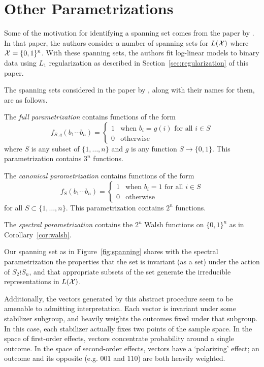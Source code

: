 \documentclass[cclicense]{hmcthesis}
\numberwithin{equation}{chapter}
\numberwithin{ucounter}{chapter}
\begin{document}
\section{Other Parametrizations}

    Some of the motivation for identifying a spanning set comes from the paper
    by \citet{SPEC}.  In that paper, the authors consider a number of spanning
    sets for $L(\mathcal{X})$ where $\mathcal{X} = \{0, 1\}^n$.  With these spanning sets, the
    authors fit log-linear models to binary data using $L_1$ regularization as
    described in Section~\ref{sec:regularization} of this paper.

    The spanning sets considered in the paper by \citet{SPEC}, along with their
    names for them, are as follows.

    The \emph{full parametrization} contains functions of the form
    \[
        f_{S, g}(b_1 \cdots b_n) = \begin{cases}
            1 & \text{when $b_i = g(i)$ for all $i \in S$} \\
            0 & \text{otherwise}
        \end{cases}
    \]
    where $S$ is any subset of $\{1, \ldots, n\}$ and $g$ is any function $S \to
    \{0, 1\}$.  This parametrization contains $3^n$ functions.

    The \emph{canonical parametrization} contains functions of the form
    \[
        f_S(b_1 \cdots b_n) = \begin{cases}
            1 & \text{when $b_i = 1$ for all $i \in S$} \\
            0 & \text{otherwise}
        \end{cases}
    \]
    for all $S \subset \{1, \ldots, n\}$.  This parametrization contains $2^n$
    functions.

    The \emph{spectral parametrization} contains the $2^n$ Walsh functions on
    $\{0, 1\}^n$ as in Corollary~\ref{cor:walsh}.

    Our spanning set as in Figure~\ref{fig:spanning} shares with the spectral
    parametrization the properties that the set is invariant (as a set) under
    the action of $S_2 \wr S_n$, and that appropriate subsets of the set generate
    the irreducible representations in $L(\mathcal{X})$.  
    
    Additionally, the vectors generated by this abstract procedure seem to be
    amenable to admitting interpretation.  Each vector is invariant under some
    stabilizer subgroup, and heavily weights the outcomes fixed under that
    subgroup.  In this case, each stabilizer actually fixes two points of the
    sample space.  In the space of first-order effects, vectors concentrate
    probability around a single outcome.  In the space of second-order effects,
    vectors have a `polarizing' effect; an outcome and its opposite (e.g. $001$
    and $110$) are both heavily weighted.
\end{document}
